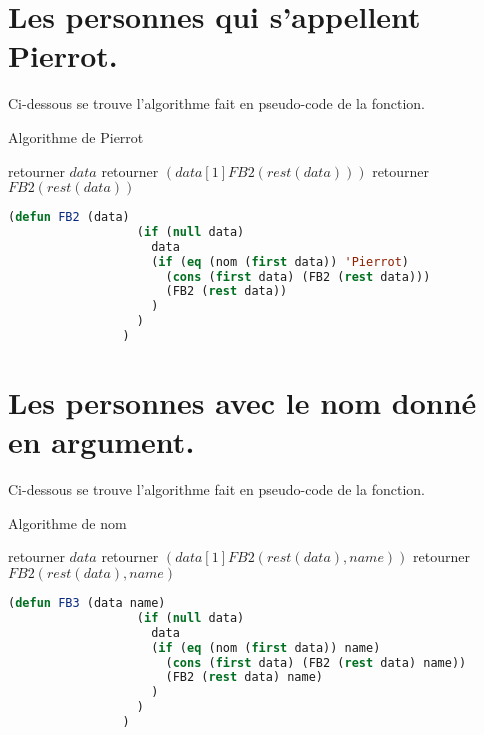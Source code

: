 \documentclass[a4paper, 12pt, leqno]{report}
\theoremstyle{plain}
\begin{document}
            \section{Les personnes qui s'appellent Pierrot.}
        Ci-dessous se trouve l'algorithme fait en pseudo-code de la fonction.
        \begin{algorithm}
            \caption{Algorithme de Pierrot}
            \begin{algorithmic}
                    \State retourner $data$
                    \State retourner $(data[1] FB2(rest(data)))$
                \Else
                    \State retourner $FB2(rest (data))$    
                \EndIf      
            \end{algorithmic}
            \end{algorithm}
            \begin{lstlisting}[label=some-code,caption=FB2(data),language=lisp]
                (defun FB2 (data) 
                  (if (null data) 
                    data 
	                (if (eq (nom (first data)) 'Pierrot) 
	                  (cons (first data) (FB2 (rest data))) 
		              (FB2 (rest data))
		            )
	              )
                )
            \end{lstlisting} 
            \newpage
           \section{Les personnes avec le nom donné en argument.}
        Ci-dessous se trouve l'algorithme fait en pseudo-code de la fonction.
        \begin{algorithm}
            \caption{Algorithme de nom}
            \begin{algorithmic}
                    \State retourner $data$
                    \State retourner $(data[1] FB2(rest(data), name))$
                \Else
                    \State retourner $FB2(rest (data), name)$    
                \EndIf      
            \end{algorithmic}
            \end{algorithm}
            \begin{lstlisting}[label=some-code,caption=FB3(data name),language=lisp]
                (defun FB3 (data name) 
                  (if (null data) 
                    data 
	                (if (eq (nom (first data)) name) 
	                  (cons (first data) (FB2 (rest data) name)) 
		              (FB2 (rest data) name)
		            )
	              )
                )
            \end{lstlisting} 
            
\end{document}
